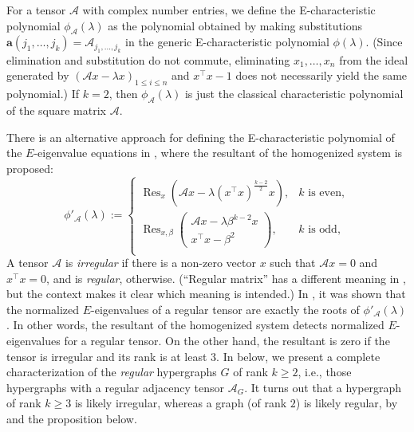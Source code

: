 \documentclass[12pt]{article}
\numberwithin{equation}{section}
\theoremstyle{definition}
\newcommand{\ev}[1]{( #1 )}
\begin{document}
For a tensor $\mathcal{A}$ with complex number entries, we define the E-characteristic polynomial $\phi_\mathcal{A}\ev{\lambda}$ as the polynomial obtained by making substitutions $ \mathbf{a}\ev{j_1,\ldots,j_k} = \mathcal{A}_{j_1,\ldots,j_k}$ in the generic E-characteristic polynomial $\phi\ev{\lambda}$. (Since elimination and substitution do not commute, eliminating $x_1,\ldots,x_n$ from the ideal generated by $(\mathcal{A}x - \lambda x)_{1\leq i \leq n}$ and $x^\top x - 1$ does not necessarily yield the same polynomial.) If $k=2$, then $\phi_{\mathcal{A}}(\lambda)$ is just the classical characteristic polynomial of the square matrix $\mathcal{A}$. 

There is an alternative approach for defining the E-characteristic polynomial of the $E$-eigenvalue equations in \cite{Q2007}, where the resultant of the homogenized system is proposed:
\begin{equation} 
\phi'_{\mathcal{A}}(\lambda) :=\begin{cases}
\operatorname{Res}_x ( \mathcal{A}x - \lambda(x^\top x)^{\frac{k-2}2} x), & k \text{ is even}, \\
\operatorname{Res}_{x,\beta} \left(\begin{smallmatrix}
\mathcal{A}x-\lambda\beta^{k-2}x \\
x^\top x -\beta^2
\end{smallmatrix}\right), & k \text{ is odd}, \\
\end{cases}
\end{equation}
A tensor $\mathcal{A}$ is \textit{irregular} if there is a non-zero vector $x$ such that $\mathcal{A}x = 0$ and $x^\top x = 0$, and is \textit{regular}, otherwise. (``Regular matrix'' has a different meaning in , but the context makes it clear which meaning is intended.) In \cite[Theorem 4]{Q2007}, it was shown that the normalized $E$-eigenvalues of a regular tensor are exactly the roots of $\phi'_{\mathcal{A}}(\lambda)$. In other words, the resultant of the homogenized system detects normalized $E$-eigenvalues for a regular tensor. On the other hand, the resultant is zero if the tensor is irregular and its rank is at least $3$. In  below, we present a complete characterization of the \textit{regular} hypergraphs $G$ of rank $k\geq 2$, i.e., those hypergraphs with a regular adjacency tensor $\mathcal{A}_G$. It turns out that a hypergraph of rank $k\geq 3$ is likely irregular, whereas a graph (of rank $2$) is likely regular, by \cite[Theorem 1.2, p.~270]{costello_vu} and the proposition below.
\end{document}
